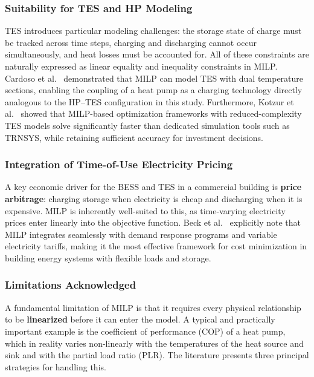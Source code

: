 \documentclass[11pt,a4paper]{report}
\begin{document}
\subsubsection*{Suitability for TES and HP Modeling}

TES introduces particular modeling challenges: the storage state of charge must be tracked across time steps, charging and discharging cannot occur simultaneously, and heat losses must be accounted for. All of these constraints are naturally expressed as linear equality and inequality constraints in MILP. Cardoso et al.~\cite{cardoso2014milp} demonstrated that MILP can model TES with dual temperature sections, enabling the coupling of a heat pump as a charging technology directly analogous to the HP--TES configuration in this study. Furthermore, Kotzur et al.~\cite{kotzur2018milp} showed that MILP-based optimization frameworks with reduced-complexity TES models solve significantly faster than dedicated simulation tools such as TRNSYS, while retaining sufficient accuracy for investment decisions.

\subsubsection*{Integration of Time-of-Use Electricity Pricing}

A key economic driver for the BESS and TES in a commercial building is \textbf{price arbitrage}: charging storage when electricity is cheap and discharging when it is expensive. MILP is inherently well-suited to this, as time-varying electricity prices enter linearly into the objective function. Beck et al.~\cite{beck2021milp} explicitly note that MILP integrates seamlessly with demand response programs and variable electricity tariffs, making it the most effective framework for cost minimization in building energy systems with flexible loads and storage.

\subsubsection*{Limitations Acknowledged}

A fundamental limitation of MILP is that it requires every physical relationship to be \textbf{linearized} before it can enter the model. A typical and practically important example is the coefficient of performance (COP) of a heat pump, which in reality varies non-linearly with the temperatures of the heat source and sink and with the partial load ratio (PLR). The literature presents three principal strategies for handling this.
\end{document}
